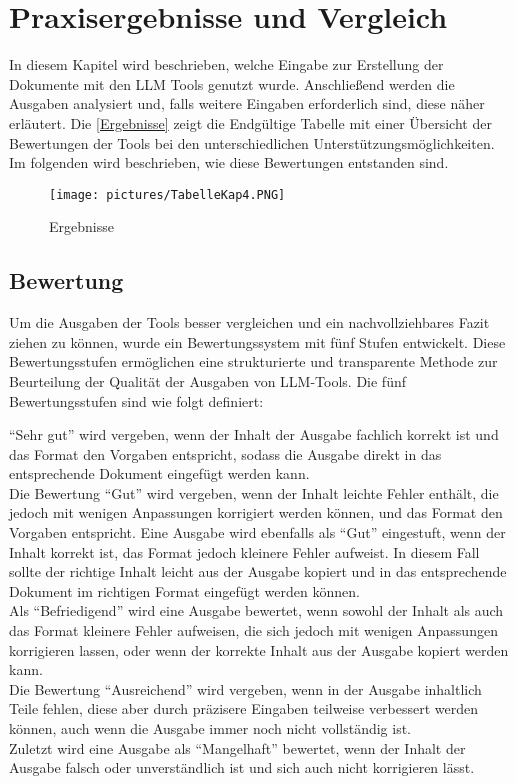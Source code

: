 
\chapter{Praxisergebnisse und Vergleich} 

In diesem Kapitel wird beschrieben, welche Eingabe zur Erstellung der Dokumente mit den LLM Tools 
genutzt wurde. Anschließend werden die Ausgaben analysiert und, falls weitere Eingaben erforderlich sind, 
diese näher erläutert. Die \autoref{Ergebnisse} zeigt die Endgültige Tabelle mit einer Übersicht der Bewertungen 
der Tools bei den unterschiedlichen Unterstützungsmöglichkeiten. Im folgenden wird beschrieben, wie diese Bewertungen 
entstanden sind.

\begin{figure}
    \centering
    \texttt{[image: pictures/TabelleKap4.PNG]}
    \caption{Ergebnisse}
    \label{Ergebnisse}
\end{figure}

\section*{Bewertung}

Um die Ausgaben der Tools besser vergleichen und ein nachvollziehbares Fazit ziehen zu können, wurde ein Bewertungssystem 
mit fünf Stufen entwickelt. Diese Bewertungsstufen ermöglichen eine strukturierte und transparente Methode zur Beurteilung 
der Qualität der Ausgaben von LLM-Tools. Die fünf Bewertungsstufen sind wie folgt definiert:

``Sehr gut'' wird vergeben, wenn der Inhalt der Ausgabe fachlich korrekt ist und das Format den Vorgaben entspricht, sodass 
die Ausgabe direkt in das entsprechende Dokument eingefügt werden kann.\\
Die Bewertung ``Gut'' wird vergeben, wenn der Inhalt leichte Fehler enthält, die jedoch mit wenigen Anpassungen korrigiert 
werden können, und das Format den Vorgaben entspricht. Eine Ausgabe wird ebenfalls als ``Gut'' eingestuft, wenn der Inhalt 
korrekt ist, das Format jedoch kleinere Fehler aufweist. In diesem Fall sollte der richtige Inhalt leicht aus der Ausgabe 
kopiert und in das entsprechende Dokument im richtigen Format eingefügt werden können.\\
Als ``Befriedigend'' wird eine Ausgabe bewertet, wenn sowohl der Inhalt als auch das Format kleinere Fehler aufweisen, die sich 
jedoch mit wenigen Anpassungen korrigieren lassen, oder wenn der korrekte Inhalt aus der Ausgabe kopiert werden kann.\\
Die Bewertung ``Ausreichend'' wird vergeben, wenn in der Ausgabe inhaltlich Teile fehlen, diese aber durch präzisere Eingaben 
teilweise verbessert werden können, auch wenn die Ausgabe immer noch nicht vollständig ist.\\
Zuletzt wird eine Ausgabe als ``Mangelhaft'' bewertet, wenn der Inhalt der Ausgabe falsch oder unverständlich ist und sich 
auch nicht korrigieren lässt.

